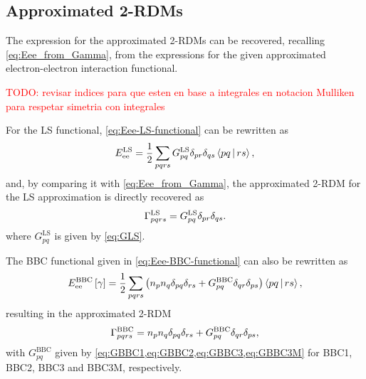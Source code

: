 \subsection{Approximated 2-RDMs}

The expression for the approximated 2-RDMs can be recovered, recalling
\cref{eq:Eee_from_Gamma}, from the expressions for the given approximated
electron-electron interaction functional.

\textcolor{red}{TODO: revisar indices para que esten en base a integrales en
notacion Mulliken para respetar simetria con integrales}

For the LS functional, \cref{eq:Eee-LS-functional} can be rewritten as 
\begin{equation}
    E_{\text{ee}}^{\text{LS}} =
    \frac{1}{2} \sum_{pqrs} G_{pq}^{\text{LS}}
    \delta_{pr} \delta_{qs} \Braket{pq | rs} 
    ,
\end{equation}
and, by comparing it with \cref{eq:Eee_from_Gamma}, the approximated 2-RDM
for the LS approximation is directly recovered as 
\begin{equation}
    \Gamma_{pqrs}^{\text{LS}} =
    G_{pq}^{\text{LS}}
    \delta_{pr} \delta_{qs}
    .
\end{equation}
where $G_{pq}^{\text{LS}}$ is given by \cref{eq:GLS}.

The BBC functional given in \cref{eq:Eee-BBC-functional} can also be rewritten as
\begin{equation}
    E_{\text{ee}}^{\text{BBC}}\left[ \fordm \right] =
    \frac{1}{2} \sum_{pqrs} \left( 
        n_p n_q \delta_{pq} \delta_{rs} +
        G_{pq}^{\text{BBC}} \delta_{qr} \delta_{ps}
    \right) \Braket{pq | rs}
    ,
\end{equation}
resulting in the approximated 2-RDM
\begin{equation}
    \Gamma_{pqrs}^{\text{BBC}} =
    n_p n_q \delta_{pq} \delta_{rs} +
    G_{pq}^{\text{BBC}} \delta_{qr} \delta_{ps}
    ,
\end{equation}
with $G_{pq}^{\text{BBC}}$ given by \cref{eq:GBBC1,eq:GBBC2,eq:GBBC3,eq:GBBC3M}
for BBC1, BBC2, BBC3 and BBC3M, respectively.
